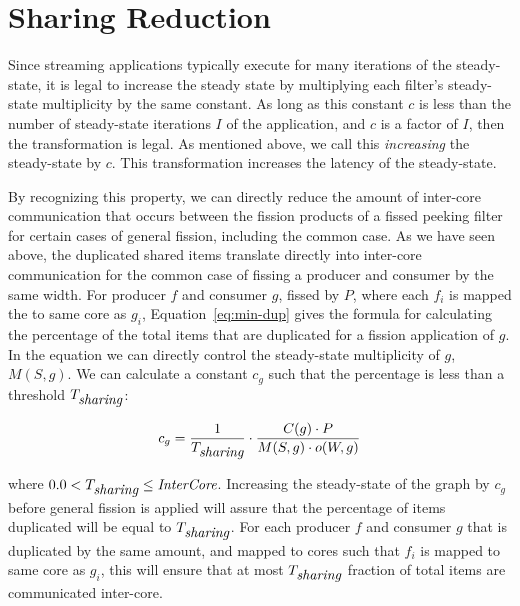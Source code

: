 \section{Sharing Reduction}

Since streaming applications typically execute for
many iterations of the steady-state, it is legal to increase the
steady state by multiplying each filter's steady-state multiplicity by
the same constant.  As long as this constant $c$ is less than the number
of steady-state iterations $I$ of the application, and $c$ is a factor of
$I$, then the transformation is legal.  As mentioned above, we call
this {\it increasing} the steady-state by $c$.  This transformation
increases the latency of the steady-state.

By recognizing this property, we can directly reduce the amount of
inter-core communication that occurs between the fission products of a
fissed peeking filter for certain cases of general fission, including
the common case.  As we have seen above, the duplicated shared items
translate directly into inter-core communication for the common case
of fissing a producer and consumer by the same width.  For producer
$f$ and consumer $g$, fissed by $P$, where each $f_i$ is mapped the to
same core as $g_i$, Equation~\ref{eq:min-dup} gives the formula for
calculating the percentage of the total items that are duplicated for
a fission application of $g$.  In the equation we can directly control
the steady-state multiplicity of $g$, $M(S,g)$.  We can calculate a
constant $c_g$ such that the percentage is less than a threshold
$T_{\mbox{\it sharing}}$:

\begin{equation}
\label{eq:ic-thresh}
c_g = \frac{1}{T_{\mbox{\it sharing}}} \cdot \frac{C(g) \cdot P}{M(S,g) \cdot o(W,g)}
\end{equation}

\noindent where $0.0 < T_{\mbox{\it sharing}} \le \mbox{\it InterCore}$. Increasing the
steady-state of the graph by $c_g$ before general fission is applied
will assure that the percentage of items duplicated will be equal to
$T_{\mbox{\it sharing}}$.  For each producer $f$ and consumer $g$ that is
duplicated by the same amount, and mapped to cores such that $f_i$ is
mapped to same core as $g_i$, this will ensure that at most
$T_{\mbox{\it sharing}}$ fraction of total items are communicated inter-core.


